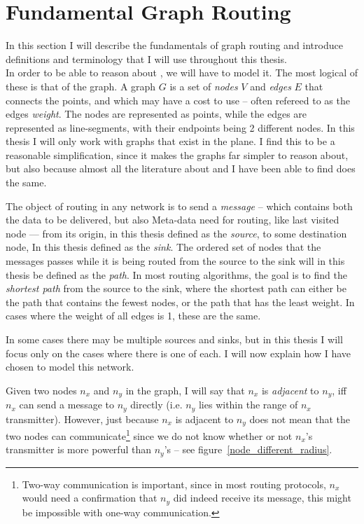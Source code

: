 \section{Fundamental Graph Routing}
\label{fundamental}
In this section I will describe the fundamentals of graph routing and introduce definitions and terminology that I will use throughout this thesis.\\

In order to be able to reason about \manet, we will have to model it. The most logical of these is that of the graph. A graph $G$ is a set of \emph{nodes} $V$ and \emph{edges} $E$ that connects the points, and which may have a cost to use -- often refereed to as the edges \emph{weight}. The nodes are represented as points, while the edges are represented as line-segments, with their endpoints being 2 different nodes. In this thesis I will only work with graphs that exist in the plane. I find this to be a reasonable simplification, since it makes the graphs far simpler to reason about, but also because almost all the literature about \manet and \anet I have been able to find does the same. 

The object of routing in any network is to send a \emph{message} -- which contains both the data to be delivered, but also Meta-data need for routing, like last visited node --- from its origin, in this thesis defined as the \emph{source}, to some destination node, In this thesis defined as the \emph{sink}. The ordered set of nodes that the messages passes while it is being routed from the source to the sink will in this thesis be defined as the \emph{path}. In most routing algorithms, the goal is to find the \emph{shortest path} from the source to the sink, where the shortest path can either be the path that contains the fewest nodes, or the path that has the least weight. In cases where the weight of all edges is 1, these are the same. 

In some cases there may be multiple sources and sinks, but in this thesis I will focus only on the cases where there is one of each. I will now explain how I have chosen to model this network. 


Given two nodes $n_x$ and $n_y$ in the graph, I will say that $n_x$ is \emph{adjacent} to $n_y$, iff $n_x$ can send a message to $n_y$ directly (i.e. $n_y$ lies within the range of $n_x$ transmitter). However, just because $n_x$ is adjacent to $n_y$ does not mean that the two nodes can communicate\footnote{Two-way communication is important, since in most routing protocols, $n_x$ would need a confirmation that $n_y$ did indeed receive its message, this might be impossible with one-way communication.} since we do not know whether or not $n_x$'s transmitter is more powerful than $n_y$'s -- see figure~\ref{node_different_radius}. 

